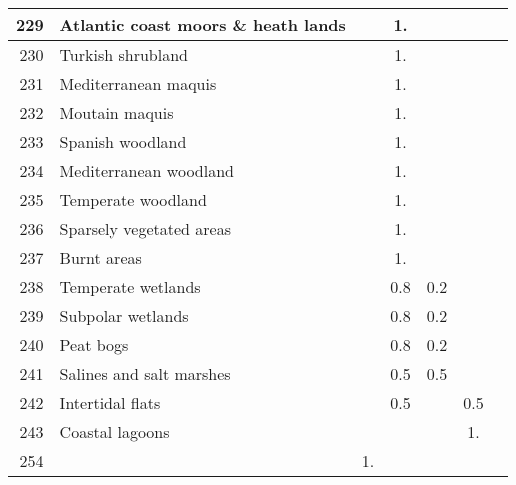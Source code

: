 {{\begin{tabular}{||r|l||c|c|c|c|c||}
 \hline
         229  & Atlantic coast moors \& heath lands                          &       &  1.   &       &       \\
 \hline
 \hline
         230  & Turkish shrubland                                            &       &  1.   &       &       \\
 \hline
         231  & Mediterranean maquis                                         &       &  1.   &       &       \\
 \hline
         232  & Moutain maquis                                               &       &  1.   &       &       \\
 \hline
 \hline
         233  & Spanish woodland                                             &       &  1.   &       &       \\
 \hline
         234  & Mediterranean woodland                                       &       &  1.   &       &       \\
 \hline
         235  & Temperate woodland                                           &       &  1.   &       &       \\
 \hline
 \hline
         236  & Sparsely vegetated areas                                     &       &  1.   &       &       \\
 \hline
         237  & Burnt areas                                                  &       &  1.   &       &       \\
 \hline
         238  & Temperate wetlands                                           &       &  0.8  &  0.2  &       \\
 \hline
         239  & Subpolar wetlands                                            &       &  0.8  &  0.2  &       \\
 \hline
         240  & Peat bogs                                                    &       &  0.8  &  0.2  &       \\
 \hline
         241  & Salines and salt marshes                                     &       &  0.5  &  0.5  &       \\
 \hline
 \hline
         242  & Intertidal flats                                             &       &  0.5  &       &  0.5  \\
 \hline
         243  & Coastal lagoons                                              &       &       &       &  1.   \\
 \hline
 \hline
         254  &                                                              &  1.   &       &       &       \\

\end{tabular}}}
